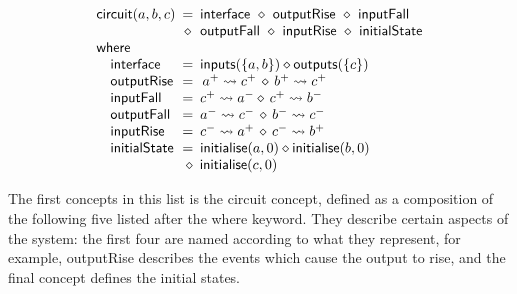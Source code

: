 \documentclass[british, journal]{IEEEtran}
\begin{document}
\vspace{-2mm}
\[
\begin{array}{lcl}
\mathsf{circuit}(a,b,c)&\hspace{-2mm}=&\hspace{-2mm}\mathsf{interface}~\diamond~\mathsf{outputRise}~\diamond~\mathsf{inputFall}\\
~&\hspace{-2mm}\diamond&\hspace{-2mm}\mathsf{outputFall}~\diamond~\mathsf{inputRise}~\diamond~\mathsf{initialState}\\
\mathsf{where}&~&\\
\,\,\,\,\,\,\mathsf{interface}&\hspace{-2mm}=&\hspace{-2mm}\mathsf{inputs}(\{a,b\})\diamond\mathsf{outputs}(\{c\})\\
\,\,\,\,\,\,\mathsf{outputRise}&\hspace{-2mm}=&\hspace{-2mm}\,a^{+}\rightsquigarrow c^{+}\,\diamond\, b^{+}\rightsquigarrow c^{+}\\
\,\,\,\,\,\,\mathsf{inputFall}&\hspace{-2mm}=&\hspace{-2mm}c ^ {+} \rightsquigarrow a^{-} \diamond\, c ^ {+} \rightsquigarrow b^{-}\\
\,\,\,\,\,\,\mathsf{outputFall}&\hspace{-2mm}=&\hspace{-2mm}a^{-} \rightsquigarrow c^{-} \,\diamond\, b^{-} \rightsquigarrow c^{-}\\
\,\,\,\,\,\,\mathsf{inputRise}&\hspace{-2mm}=&\hspace{-2mm}c^{-} \rightsquigarrow a^{+} \,\diamond\, c^{-} \rightsquigarrow b^{+}\\
\,\,\,\,\,\,\mathsf{initialState}&\hspace{-2mm}=&\hspace{-2mm}\mathsf{initialise}(a,0) \diamond \mathsf{initialise}(b,0) \\
&~&\hspace{-5.6mm}\diamond\,\,\,\mathsf{initialise}(c,0)\\
\end{array}
\]
\vspace{-1mm}

The first concepts in this list is the \textsf{circuit} concept, defined as a
composition of the following five listed after the \textsf{where} keyword.
They describe certain aspects of the system: the first four are named
according to what they represent, for example, \textsf{outputRise} describes
the events which cause the output to rise, and the final concept defines
the initial states.
\end{document}

